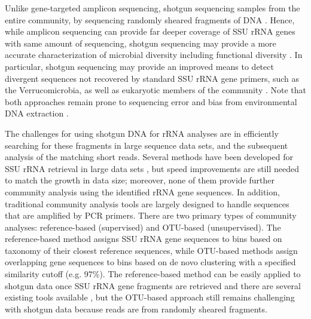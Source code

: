 \documentclass[]{msu-thesis}
\begin{document}
Unlike gene-targeted amplicon sequencing, shotgun sequencing samples from the entire community, by sequencing randomly sheared fragments of DNA \cite{tyson_community_2004,qin_human_2010}. Hence, while amplicon sequencing can provide far deeper coverage of SSU rRNA genes with same amount of sequencing, shotgun sequencing may provide a more accurate characterization of microbial diversity including functional diversity \cite{shakya_comparative_2013}. In particular, shotgun sequencing may provide an improved means to detect divergent sequences not recovered by standard SSU rRNA gene primers, such as the Verrucomicrobia, as well as eukaryotic members of the community \cite{bergmann_under-recognized_2011,shakya_comparative_2013,baker_review_2003,frank_critical_2008}. Note that both approaches remain prone to sequencing error and bias from environmental DNA extraction \cite{haas_chimeric_2011}.

The challenges for using shotgun DNA for rRNA analyses are in efficiently searching for these fragments in large sequence data sets, and the subsequent analysis of the matching short reads. Several methods have been developed for SSU rRNA retrieval in large data sets \cite{schmieder_identification_2012,huang_identification_2009,lee_rrnaselector:_2011,bengtsson_metaxa:_2011}, but speed improvements are still needed to match the growth in data size; moreover, none of them provide further community analysis using the identified rRNA gene sequences. In addition, traditional community analysis tools \cite{cole_ribosomal_2014,schloss_introducing_2009,kuczynski_using_2012} are largely designed to handle sequences that are amplified by PCR primers. There are two primary types of community analyses: reference-based (supervised) and OTU-based (unsupervised). The reference-based method assigns SSU rRNA gene sequences to bins based on taxonomy of their closest reference sequences, while OTU-based methods assign overlapping gene sequences to bins based on de novo clustering with a specified similarity cutoff (e.g. 97\%). The reference-based method can be easily applied to shotgun data once SSU rRNA gene fragments are retrieved \cite{wang_naive_2007} and there are several existing tools available \cite{shah_comparing_2011,darling_phylosift:_2014,meyer_metagenomics_2008,huson_megan_2007,logares_metagenomic_2014}, but the OTU-based approach still remains challenging with shotgun data because reads are from randomly sheared fragments.
\end{document}
